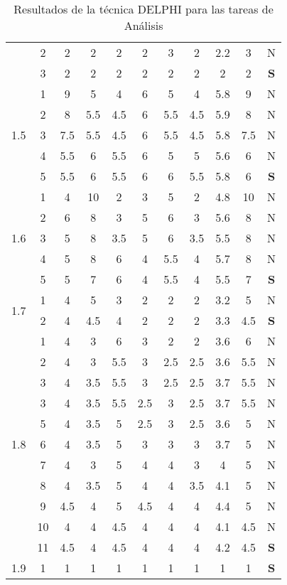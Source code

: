 \documentclass[11pt,a4paper,spanish,twoside]{report}
\begin{document}
\begin{table}[!h]
\begin{tabular}{|c|c||c|c|c|c|c||c|c|c||c|}
    & 2 & 2 & 2 & 2 & 2 & 3 & 2 & 2.2 & 3 & N \\
    & 3 & 2 & 2 & 2 & 2 & 2 & 2 & 2 & 2 & \textbf{S} \\
    \hline
    \multirow{5}{*}{1.5} & 1 & 9 & 5 & 4 & 6 & 5 & 4 & 5.8 & 9 & N \\
    & 2 & 8 & 5.5 & 4.5 & 6 & 5.5 & 4.5 & 5.9 & 8 & N \\
    & 3 & 7.5 & 5.5 & 4.5 & 6 & 5.5 & 4.5 & 5.8 & 7.5 & N \\
    & 4 & 5.5 & 6 & 5.5 & 6 & 5 & 5 & 5.6 & 6 & N \\
    & 5 & 5.5 & 6 & 5.5 & 6 & 6 & 5.5 & 5.8 & 6 & \textbf{S} \\
    \hline
    \multirow{5}{*}{1.6} & 1 & 4 & 10 & 2 & 3 & 5 & 2 & 4.8 & 10 & N \\
    & 2 & 6 & 8 & 3 & 5 & 6 & 3 & 5.6 & 8 & N \\
    & 3 & 5 & 8 & 3.5 & 5 & 6 & 3.5 & 5.5 & 8 & N \\
    & 4 & 5 & 8 & 6 & 4 & 5.5 & 4 & 5.7 & 8 & N \\
    & 5 & 5 & 7 & 6 & 4 & 5.5 & 4 & 5.5 & 7 & \textbf{S} \\
    \hline
    \multirow{2}{*}{1.7} & 1 & 4 & 5 & 3 & 2 & 2 & 2 & 3.2 & 5 & N \\
    & 2 & 4 & 4.5 & 4 & 2 & 2 & 2 & 3.3 & 4.5 & \textbf{S} \\
    \hline
    \multirow{11}{*}{1.8} & 1 & 4 & 3 & 6 & 3 & 2 & 2 & 3.6 & 6   & N \\
    & 2 & 4 & 3   & 5.5 & 3   & 2.5 & 2.5 & 3.6 & 5.5 & N \\
    & 3 & 4 & 3.5 & 5.5 & 3   & 2.5 & 2.5 & 3.7 & 5.5 & N \\
    & 3 & 4 & 3.5 & 5.5 & 2.5 & 3   & 2.5 & 3.7 & 5.5 & N \\
    & 5 & 4 & 3.5 & 5   & 2.5 & 3   & 2.5 & 3.6 & 5   & N \\
    & 6 & 4 & 3.5 & 5   & 3   & 3   & 3   & 3.7 & 5   & N \\
    & 7 & 4 & 3   & 5   & 4   & 4   & 3   & 4   & 5   & N \\
    & 8 & 4 & 3.5 & 5   & 4   & 4   & 3.5 & 4.1 & 5   & N \\
    & 9 & 4.5 & 4 & 5 & 4.5 & 4 & 4 & 4.4 & 5 & N \\
    & 10 & 4 & 4 & 4.5 & 4 & 4 & 4 & 4.1 & 4.5 & N \\
    & 11 & 4.5 & 4 & 4.5 & 4 & 4 & 4 & 4.2 & 4.5 & \textbf{S} \\
    \hline
    1.9 & 1 & 1 & 1 & 1 & 1 & 1 & 1 & 1 & 1 & \textbf{S} \\
    \hline
  \end{tabular}
  \caption{Resultados de la técnica DELPHI para las tareas de
    Análisis} \label{Tab:val}
\end{table}
\end{document}
